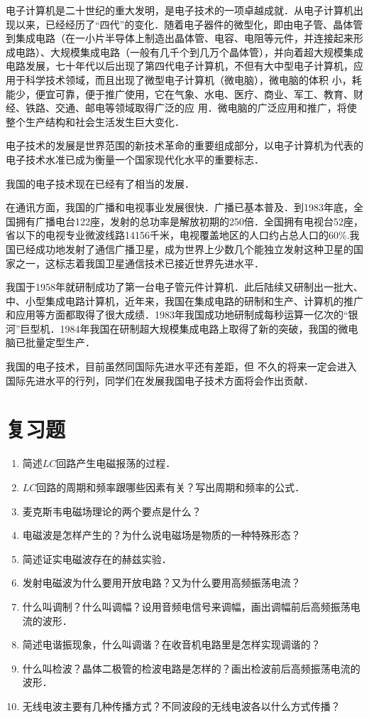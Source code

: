 电子计算机是二十世纪的重大发明，是电子技术的一项卓越成就．从电子计算机出现以来，已经经历了“四代”的变化．随着电子器件的微型化，即由电子管、晶体管到集成电路（在一小片半导体上制造出晶体管、电容、电阻等元件，并连接起来形成电路）、大规模集成电路（一般有几千个到几万个晶体管），并向着超大规模集成电路发展，七十年代以后出现了第四代电子计算机，不但有大中型电子计算机，应用于科学技术领域，而且出现了微型电子计算机（微电脑），微电脑的体积
小，耗能少，便宜可靠，便于推广使用，它在气象、水电、医疗、商业、军工、教育、财经、铁路、交通、邮电等领域取得广泛的应
用．微电脑的广泛应用和推广，将使整个生产结构和社会生活发生巨大变化．

电子技术的发展是世界范围的新技术革命的重要组成部分，以电子计算机为代表的电子技术水准已成为衡量一个国家现代化水平的重要标志．

我国的电子技术现在已经有了相当的发展．

在通讯方面，我国的广播和电视事业发展很快．广播已基本普及．到1983年底，全国拥有广播电台122座，发射的总功率是解放初期的250倍．全国拥有电视台52座，省以下的电视专业微波线路14156千米，电视覆盖地区的人口约占总人口的60\%.我国已经成功地发射了通信广播卫星，成为世界上少数几个能独立发射这种卫星的国家之一，这标志着我国卫星通信技术已接近世界先进水平．

我国于1958年就研制成功了第一台电子管元件计算机．此后陆续又研制出一批大、中、小型集成电路计算机，近年来，我国在集成电路的研制和生产、计算机的推广和应用等方面都取得了很大成绩．1983年我国成功地研制成每秒运算一亿次的“银河”巨型机．1984年我国在研制超大规模集成电路上取得了新的突破，我国的微电脑已批量定型生产．

我国的电子技术，目前虽然同国际先进水平还有差距，但
不久的将来一定会进入国际先进水平的行列，同学们在发展我国电子技术方面将会作出贡献．

\section*{复习题}
\begin{enumerate}
	\item 简述$LC$回路产生电磁报荡的过程．
	\item $LC$回路的周期和频率跟哪些因素有关？写出周期和频率的公式．
	\item 麦克斯韦电磁场理论的两个要点是什么？
	\item 电磁波是怎样产生的？为什么说电磁场是物质的一种特殊形态？
	\item 简述证实电磁波存在的赫兹实验．
	\item 发射电磁波为什么要用开放电路？又为什么要用高频振荡电流？
	\item 什么叫调制？什么叫调幅？设用音频电信号来调幅，画出调幅前后高频振荡电流的波形．
	\item 简述电谐振现象，什么叫调谐？在收音机电路里是怎样实现调谐的？
	\item 什么叫检波？晶体二极管的检波电路是怎样的？画出检波前后高频振荡电流的波形．
	\item 无线电波主要有几种传播方式？不同波段的无线电波各以什么方式传播？
\end{enumerate}

